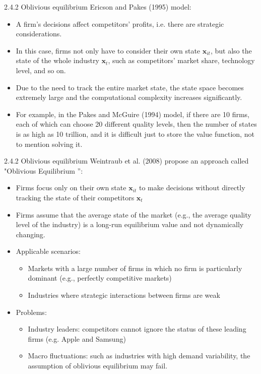 \documentclass[aspectratio=169]{beamer}  %
\begin{document}
\begin{frame}
{2.4.2 Oblivious equilibrium}
Ericson and Pakes (1995) model:
\begin{itemize}

    \item A firm's decisions affect competitors' profits, i.e. there are strategic considerations. 
    \item In this case, firms not only have to consider their own state $\mathbf{x}_{it}$, but also the state of the whole industry $\mathbf{x}_t$, such as competitors' market share, technology level, and so on.
    \item Due to the need to track the entire market state, the state space becomes extremely large and the computational complexity increases significantly.
    \item For example, in the Pakes and McGuire (1994) model, if there are 10 firms, each of which can choose 20 different quality levels, then the number of states is as high as 10 trillion, and it is difficult just to store the value function, not to mention solving it.
\end{itemize}
\end{frame}



\begin{frame}
{2.4.2 Oblivious equilibrium}
Weintraub et al. (2008) propose an approach called "Oblivious Equilibrium ”:
\begin{itemize}
    \item Firms focus only on their own state $\mathbf{x}_{it}$ to make decisions without directly tracking the state of their competitors $\mathbf{x}_t$
    \item Firms assume that the average state of the market (e.g., the average quality level of the industry) is a long-run equilibrium value and not dynamically changing.
    \item Applicable scenarios:
    \begin{itemize}
        \item Markets with a large number of firms in which no firm is particularly dominant (e.g., perfectly competitive markets)
        \item Industries where strategic interactions between firms are weak
    \end{itemize}
    
    \item Problems:
    \begin{itemize}
        \item Industry leaders: competitors cannot ignore the status of these leading firms (e.g. Apple and Samsung)
    \item Macro fluctuations: such as industries with high demand variability, the assumption of oblivious equilibrium may fail.
    \end{itemize}
\end{itemize}
\end{frame}
\end{document}

